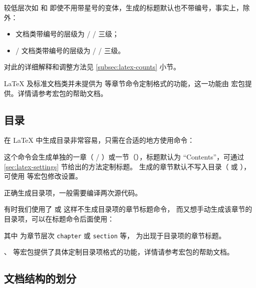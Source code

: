 较低层次如  和  即使不用带星号的变体，生成的标题默认也不带编号，事实上，除  外：
\begin{itemize}
  \item {} 文档类带编号的层级为  /  /  三级；
  \item {} /  文档类带编号的层级为  /  /  三级。
\end{itemize}
对此的详细解释和调整方法见 \ref{subsec:latex-counts} 小节。

\LaTeX{} 及标准文档类并未提供为  等章节命令定制格式的功能，这一功能由  宏包提供。详情请参考宏包的帮助文档。

\subsection{目录}\label{sec:toc}

在 \LaTeX{} 中生成目录非常容易，只需在合适的地方使用命令：
\begin{command}
\end{command}

这个命令会生成单独的一章（ / ）或一节（），标题默认为 ``Contents''{}，可通过 \ref{sec:latex-settings} 节给出的方法定制标题。
 生成的章节默认不写入目录（ 或 ），可使用  等宏包修改设置。

正确生成目录项，一般需要编译两次源代码。

有时我们使用了  或  这样不生成目录项的章节标题命令，
而又想手动生成该章节的目录项，可以在标题命令后面使用：
\begin{command}
\end{command}

其中  为章节层次 \texttt{chapter} 或 \texttt{section} 等， 为出现于目录项的章节标题。

、 等宏包提供了具体定制目录项格式的功能，详情请参考宏包的帮助文档。

\subsection{文档结构的划分}\label{sec:matters}

